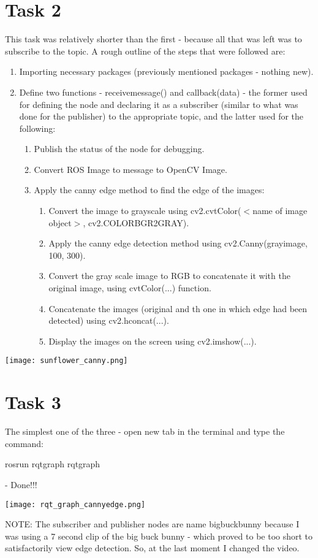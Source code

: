 \documentclass{article}
\begin{document}
\section {Task 2}
This task was relatively shorter than the first - because all that was left was to subscribe to the topic. A rough outline of the steps that were followed are:
\begin{enumerate}
    \item Importing necessary packages (previously mentioned packages - nothing new).
    \item Define two functions - receive\textunderscore message() and callback(data) - the former used for defining the node and declaring it as a subscriber (similar to what was done for the publisher) to the appropriate topic, and the latter used for the following:
    \begin{enumerate}
        \item Publish the status of the node for debugging.
        \item Convert ROS Image to message to OpenCV Image.
        \item Apply the canny edge method to find the edge of the images:
        \begin{enumerate}
            \item Convert the image to grayscale using cv2.cvtColor($<$name of image object$>$, cv2.COLOR\textunderscore BGR2GRAY).
            \item Apply the canny edge detection method using cv2.Canny(gray\textunderscore image, 100, 300).
            \item Convert the gray scale image to RGB to concatenate it with the original image, using cvtColor(...) function.
            \item Concatenate the images (original and th one in which edge had been detected) using cv2.hconcat(...).
            \item Display the images on the screen using cv2.imshow(...).
        \end{enumerate}
    \end{enumerate}
\end{enumerate}

\begin{center}
    \texttt{[image: sunflower\_canny.png]}
\end{center}


\section {Task 3}
The simplest one of the three - open new tab in the terminal and type the command: 

rosrun rqt\textunderscore graph rqt\textunderscore graph 

- Done!!!

\begin{center}
    \texttt{[image: rqt\_graph\_cannyedge.png]}
\end{center}

NOTE: The subscriber and publisher nodes are name bigbuckbunny because I was using a 7 second clip of the big buck bunny - which proved to be too short to satisfactorily view edge detection. So, at the last moment I changed the video.
\end{document}

